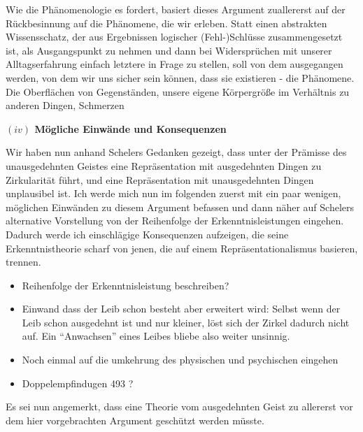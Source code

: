 \documentclass[a4paper, 12pt]{article}
\begin{document}
\begin{onehalfspace}
Wie die Phänomenologie es fordert, basiert dieses Argument zuallererst auf der Rückbesinnung auf die Phänomene, die wir erleben. Statt einen abstrakten Wissensschatz, der aus Ergebnissen logischer (Fehl-)Schlüsse zusammengesetzt ist, als Ausgangspunkt zu nehmen und dann bei Widersprüchen mit unserer Alltagserfahrung einfach letztere in Frage zu stellen, soll von dem ausgegangen werden, von dem wir uns sicher sein können, dass sie existieren - die Phänomene. Die Oberflächen von Gegenständen, unsere eigene Körpergröße im Verhältnis zu anderen Dingen, Schmerzen

\vspace{5mm}
\noindent\textbf{$(iv)$ Mögliche Einwände und Konsequenzen} %


\noindent Wir haben nun anhand Schelers Gedanken gezeigt, dass unter der Prämisse des unausgedehnten Geistes eine Repräsentation mit ausgedehnten Dingen zu Zirkularität führt, und eine Repräsentation mit unausgedehnten Dingen unplausibel ist. Ich werde mich nun im folgenden zuerst mit ein paar wenigen, möglichen Einwänden zu diesem Argument befassen und dann näher auf Schelers alternative Vorstellung von der Reihenfolge der Erkenntnisleistungen eingehen. Dadurch werde ich einschlägige Konsequenzen aufzeigen, die seine Erkenntnistheorie scharf von jenen, die auf einem Repräsentationalismus basieren, trennen.


\begin{itemize}
  \item Reihenfolge der Erkenntnisleistung beschreiben?
  \item Einwand dass der Leib schon besteht aber erweitert wird: Selbst wenn der Leib schon ausgedehnt ist und nur kleiner, löst sich der Zirkel dadurch nicht auf. Ein "`Anwachsen"' eines Leibes bliebe also weiter unsinnig.
  \item Noch einmal auf die umkehrung des physischen und psychischen eingehen 
  \item Doppelempfindugen 493 ?
\end{itemize}

Es sei nun angemerkt, dass eine Theorie vom ausgedehnten Geist zu allererst vor dem hier vorgebrachten Argument geschützt werden müsste. 






\end{onehalfspace}
\end{document}
